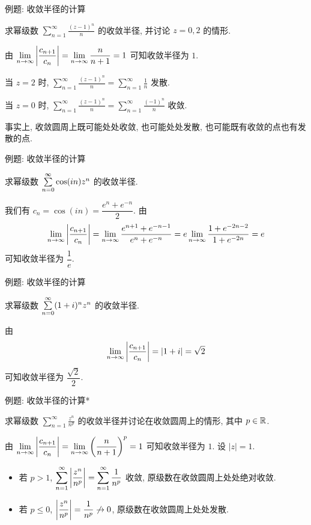 \begin{frame}{例题: 收敛半径的计算}
\begin{example}
求幂级数 $\displaystyle\sum_{n=1}^\infty\frac{(z-1)^n}n$ 的收敛半径, 并讨论 $z=0,2$ 的情形.
\end{example}
\begin{solution}
由 $\displaystyle\lim_{n\to\infty}\left|\frac{c_{n+1}}{c_n}\right|=\lim_{n\to\infty}\frac n{n+1}=1$ 可知收敛半径为 $1$.

\onslide<+->
当 $z=2$ 时, $\displaystyle\sum_{n=1}^\infty\frac{(z-1)^n}n=\sum_{n=1}^\infty\frac1n$ 发散.

\onslide<+->
当 $z=0$ 时, $\displaystyle\sum_{n=1}^\infty\frac{(z-1)^n}n=\sum_{n=1}^\infty\frac{(-1)^n}n$ 收敛.
\end{solution}
\onslide<+->
事实上, \alert{收敛圆周上既可能处处收敛, 也可能处处发散, 也可能既有收敛的点也有发散的点}.
\end{frame}


\begin{frame}{例题: 收敛半径的计算}
\begin{example}
求幂级数 $\sum\limits_{n=0}^\infty\cos(in)z^n$ 的收敛半径.
\end{example}
\begin{solution}
我们有 $c_n=\cos(in)=\dfrac{e^n+e^{-n}}2$.
\onslide<+->
由
\[\lim_{n\to\infty}\left|\frac{c_{n+1}}{c_n}\right|=\lim_{n\to\infty}\frac{e^{n+1}+e^{-n-1}}{e^n+e^{-n}}=e\lim_{n\to\infty}\frac{1+e^{-2n-2}}{1+e^{-2n}}=e\]
可知收敛半径为 $\dfrac1e$.
\end{solution}
\end{frame}


\begin{frame}{例题: 收敛半径的计算}
\begin{example}
求幂级数 $\sum\limits_{n=0}^\infty(1+i)^nz^n$ 的收敛半径.
\end{example}
\begin{solution}
由 
\[\lim_{n\to\infty}\left|\frac{c_{n+1}}{c_n}\right|=|1+i|=\sqrt2\] 可知收敛半径为 $\dfrac{\sqrt2}2$.
\end{solution}
\end{frame}


\begin{frame}{例题: 收敛半径的计算*}
\begin{example}
求幂级数 $\displaystyle\sum_{n=1}^\infty\frac{z^n}{n^p}$ 的收敛半径并讨论在收敛圆周上的情形, 其中 $p\in{\mathbb{R}}$.
\end{example}
\begin{solution}
由 $\displaystyle\lim_{n\to\infty}\left|\frac{c_{n+1}}{c_n}\right|=\lim_{n\to\infty}\left(\frac n{n+1}\right)^p=1$ 可知收敛半径为 $1$.
\onslide<+->
设 $|z|=1$.
\begin{itemize}
\item 若 $p>1$, $\displaystyle\sum_{n=1}^\infty\left|\frac{z^n}{n^p}\right|=\sum_{n=1}^\infty\frac1{n^p}$ 收敛,
\onslide<+->
原级数在收敛圆周上处处绝对收敛.
\item 若 $p\le 0$, $\left|\dfrac{z^n}{n^p}\right|=\dfrac1{n^p}\not\to0$,
\onslide<+->
原级数在收敛圆周上处处发散.
\end{itemize}
\end{solution}
\end{frame}


